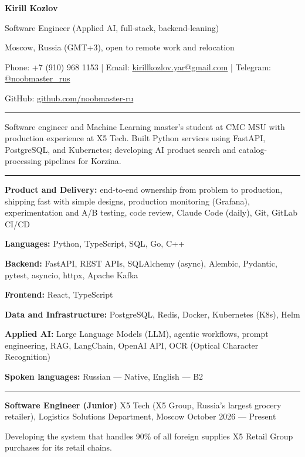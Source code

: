 \documentclass[10pt,a4paper]{article}
\newcommand{\cvsection}[1]{%
  \vspace{5pt}{\large\bfseries #1}\par\vspace{2pt}\hrule\vspace{3pt}}
\newcommand{\cventry}[3]{%
  \textbf{#1} \textbar{} #3 \textbar{} #2\par\vspace{1pt}}
\begin{document}
{\LARGE\bfseries Kirill Kozlov}\par\vspace{3pt}
Software Engineer (Applied AI, full-stack, backend-leaning)\par\vspace{3pt}
Moscow, Russia (GMT+3), open to remote work and relocation\par
Phone: +7 (910) 968 1153 | Email: \href{mailto:kirillkozlov.yar@gmail.com}{kirillkozlov.yar@gmail.com} | Telegram: \href{https://t.me/noobmaster_rus}{@noobmaster\_rus}\par
GitHub: \href{https://github.com/noobmaster-ru}{github.com/noobmaster-ru}

\cvsection{Professional Summary}
Software engineer and Machine Learning master's student at CMC MSU with production experience at X5 Tech. Built Python services using FastAPI, PostgreSQL, and Kubernetes; developing AI product search and catalog-processing pipelines for Korzina.

\cvsection{Technical Skills}
\textbf{Product and Delivery:} end-to-end ownership from problem to production, shipping fast with simple
designs, production monitoring (Grafana), experimentation and A/B testing, code review, Claude Code (daily),
Git, GitLab CI/CD\par
\textbf{Languages:} Python, TypeScript, SQL, Go, C++\par
\textbf{Backend:} FastAPI, REST APIs, SQLAlchemy (async), Alembic, Pydantic, pytest, asyncio, httpx, Apache Kafka\par
\textbf{Frontend:} React, TypeScript\par
\textbf{Data and Infrastructure:} PostgreSQL, Redis, Docker, Kubernetes (K8s), Helm\par
\textbf{Applied AI:} Large Language Models (LLM), agentic workflows, prompt engineering, RAG, LangChain, OpenAI API,
OCR (Optical Character Recognition)\par
\textbf{Spoken languages:} Russian --- Native, English --- B2

\cvsection{Work Experience}
\cventry{Software Engineer (Junior)}{October 2026 --- Present}{X5 Tech (X5 Group, Russia's largest grocery retailer), Logistics Solutions Department, Moscow}
\begin{cvitems}
    \item Developing the system that handles 90\% of all foreign supplies X5 Retail Group purchases for its retail chains.
\end{cvitems}
\vspace{2pt}
\end{document}
